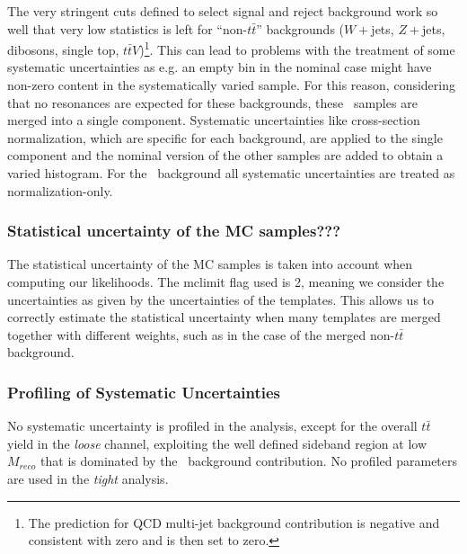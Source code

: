 The very stringent cuts defined to select signal and reject
background work so well that very low statistics is left for
``non-$t\bar{t}$'' backgrounds ($W+$jets, $Z+$jets, dibosons, single top, 
$t\bar{t}V$)\footnote{The prediction for QCD multi-jet background contribution
is negative and consistent with zero and is then set to zero.}.
This can lead to problems with the treatment of some systematic uncertainties as
e.g. an empty bin in the nominal case might have non-zero content in the
systematically varied sample. For this reason, considering that no resonances
are expected for these backgrounds, these \nontt\ samples are merged into
a single component. Systematic uncertainties like cross-section normalization,
which are specific for each background, are applied to the single component
and the nominal version of the other samples are added to obtain
a varied histogram.
For the \nontt\ background all systematic uncertainties are
treated as normalization-only.


\subsubsection{Statistical uncertainty of the MC samples???}
The statistical uncertainty of the MC samples is taken into account when computing our likelihoods.
The {\sc mclimit} flag used is 2, meaning we consider the uncertainties as given by the uncertainties of the templates. 
This allows us to correctly estimate the statistical uncertainty when many templates are merged together with different weights, such as in
the case of the merged non-$t\bar{t}$ background.

\subsubsection{Profiling of Systematic Uncertainties}

No systematic uncertainty is profiled in the analysis, except for the overall 
$t\bar{t}$ yield in the {\sl loose} channel, exploiting the well defined 
sideband region at low $M_{reco}$ that is dominated by the \ttbar\ background
contribution. No profiled parameters are used in the {\sl tight} analysis.

